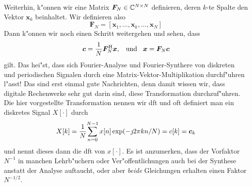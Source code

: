 Weiterhin, k"onnen wir eine Matrix $\bm F_N \in \mathbb{C}^{N \times N}$ definieren, deren $k$-te Spalte den Vektor $\bm x_k$ beinhaltet.
Wir definieren also 
\[
\bm F_N = \left[
    \bm x_1, \ldots, \bm x_k, \ldots, \bm x_N 
\right]
\]
Dann k"onnen wir noch einen Schritt weitergehen und sehen, dass
\[
\bm c = \frac{1}{N} \bm F_N^{\mathrm{H}} \bm x, {\hspace{3mm} \text{und} \hspace{3mm}} \bm x = \bm F_N \bm c
\]
gilt.
Das hei"st, dass sich Fourier-Analyse und Fourier-Synthere von diskreten und periodischen Signalen durch eine Matrix-Vektor-Multiplikation durchf"uhren l"asst!
Das sind erst einmal gute Nachrichten, denn damit wissen wir, dass digitale Rechenwerke sehr gut darin sind, diese Transformation durchzuf"uhren.
Die hier vorgestellte Transformation nennen wir \gls{dft} und oft definiert man ein diskretes Signal $X[\cdot]$ durch
\begin{equation}
    X[k] = \frac{1}{N}{\sum\limits_{n = 0}^{N-1}{x[n]\exp(-\jmath 2 \pi k n/N)}} = c[k] = \bm c_k
\end{equation}
und nennt dieses dann die \gls{dft} von $x[\cdot]$.
Es ist anzumerken, dass der Vorfaktor $N^{-1}$ in manchen Lehrb"uchern oder Ver"offentlichungen auch bei der Synthese anstatt der Analyse auftaucht, oder aber \emph{beide} Gleichungen erhalten einen Faktor $N^{-1/2}$.

